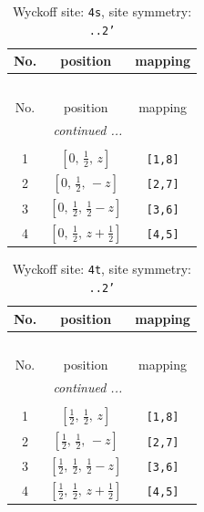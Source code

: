 \documentclass[fleqn,8pt]{jsarticle}
\begin{document}
\renewcommand{\arraystretch}{1.2}
\begin{longtable}{ccc}
\caption{Wyckoff site: {\tt 4s}, site symmetry: {\tt ..2'}}
 \\
 \hline \hline
No. & position & mapping \\ \hline \endfirsthead

\multicolumn{2}{l}{\tablename\ \thetable{}} \\
 \hline \hline
No. & position & mapping \\ \hline \endhead

 \hline \hline
\multicolumn{2}{r}{\footnotesize\it continued ...} \\ \endfoot

 \hline \hline
\multicolumn{2}{r}{} \\ \endlastfoot

1 & $\left[ 0,\, \frac{1}{2},\, z \right]$ & {\tt [1,8]} \\ \hline
2 & $\left[ 0,\, \frac{1}{2},\, - z \right]$ & {\tt [2,7]} \\ \hline
3 & $\left[ 0,\, \frac{1}{2},\, \frac{1}{2} - z \right]$ & {\tt [3,6]} \\ \hline
4 & $\left[ 0,\, \frac{1}{2},\, z + \frac{1}{2} \right]$ & {\tt [4,5]} \\
\end{longtable}
\renewcommand{\arraystretch}{1.2}
\begin{longtable}{ccc}
\caption{Wyckoff site: {\tt 4t}, site symmetry: {\tt ..2'}}
 \\
 \hline \hline
No. & position & mapping \\ \hline \endfirsthead

\multicolumn{2}{l}{\tablename\ \thetable{}} \\
 \hline \hline
No. & position & mapping \\ \hline \endhead

 \hline \hline
\multicolumn{2}{r}{\footnotesize\it continued ...} \\ \endfoot

 \hline \hline
\multicolumn{2}{r}{} \\ \endlastfoot

1 & $\left[ \frac{1}{2},\, \frac{1}{2},\, z \right]$ & {\tt [1,8]} \\ \hline
2 & $\left[ \frac{1}{2},\, \frac{1}{2},\, - z \right]$ & {\tt [2,7]} \\ \hline
3 & $\left[ \frac{1}{2},\, \frac{1}{2},\, \frac{1}{2} - z \right]$ & {\tt [3,6]} \\ \hline
4 & $\left[ \frac{1}{2},\, \frac{1}{2},\, z + \frac{1}{2} \right]$ & {\tt [4,5]} \\
\end{longtable}
\end{document}
